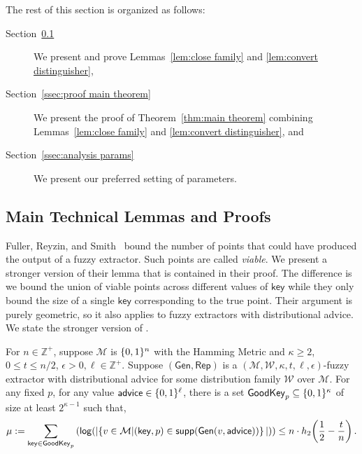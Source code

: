 \noindent
The rest of this section is organized as follows:
\begin{description}
\item[Section~\ref{ssec:proof overview}] We present and prove Lemmas~\ref{lem:close family} and \ref{lem:convert distinguisher},
\item[Section~\ref{ssec:proof main theorem}] We present the proof of Theorem~\ref{thm:main theorem} combining Lemmas~\ref{lem:close family} and \ref{lem:convert distinguisher}, and 
\item[Section~\ref{ssec:analysis params}] We present our preferred setting of parameters.
\end{description}

\subsection{Main Technical Lemmas and Proofs}
\label{ssec:proof overview}





Fuller, Reyzin, and Smith~\cite{fuller2016fuzzy,fuller2020fuzzy} bound the number of points that could have produced the output of a fuzzy extractor.  Such points are called \emph{viable}.  We present a stronger version of their lemma that is contained in their proof.  The difference is we bound the union of viable points across different values of $\mathsf{key}$ while they only bound the size of a single $\mathsf{key}$ corresponding to the true point.  Their argument is purely geometric, so it also applies to fuzzy extractors with distributional advice. 
We state the stronger version of \cite[Lemma 5.2]{fuller2020fuzzy}.

\begin{lemma}
    \label{lem:smallgeneralviable}
For $n\in \mathbb{Z}^+$, suppose $\mathcal{M}$ is $\{0, 1\}^n$ with the Hamming Metric and $\kappa \geq 2$, $0 \leq t \leq n/2$, $\epsilon > 0, \ell\in\mathbb{Z}^+$. 
    Suppose $(\mathsf{Gen, Rep})$ is a $(\mathcal{M,W},\kappa, t, \ell, \epsilon)$-fuzzy extractor with distributional advice for some distribution family $\mathcal{W}$ over $\mathcal{M}$. 
    For any fixed $p$, for any value ${\mathsf{advice}} \in \{0, 1\}^\ell$, there is a set $\mathsf{GoodKey}_p \subseteq \{0, 1\}^\kappa$ of size at least $2^{\kappa - 1}$ such that,
    \[
      \mu:= \sum_{\mathsf{key} \in \mathsf{GoodKey}_p} \left( \mathsf{log}\!\left(|\!\left\{ v \in \mathcal{M}|\!\left(\mathsf{key}, p\right) \in \mathsf{supp}\!\left(\mathsf{Gen}(v, {\mathsf{advice}})\right) \right\}|\right)\right) \leq n \cdot h_2\!\left(\frac{1}{2} - \frac{t}{n}\right).
    \]   
\end{lemma}

